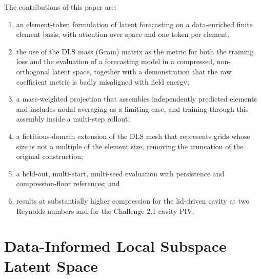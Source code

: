 \documentclass[conf]{new-aiaa}
\begin{document}
The contributions of this paper are:
\begin{enumerate}
  \item an element-token formulation of latent forecasting on a data-enriched finite element basis, with attention over space and one token per element;
  \item the use of the DLS mass (Gram) matrix as the metric for both the training loss and the evaluation of a forecasting model in a compressed, non-orthogonal latent space, together with a demonstration that the raw coefficient metric is badly misaligned with field energy;
  \item a mass-weighted projection that assembles independently predicted elements and includes nodal averaging as a limiting case, and training through this assembly inside a multi-step rollout;
  \item a fictitious-domain extension of the DLS mesh that represents grids whose size is not a multiple of the element size, removing the truncation of the original construction;
  \item a held-out, multi-start, multi-seed evaluation with persistence and compression-floor references; and
  \item results at substantially higher compression for the lid-driven cavity at two Reynolds numbers and for the Challenge 2.1 cavity PIV.
\end{enumerate}

\section{Data-Informed Local Subspace Latent Space}
\label{sec:dls}
\end{document}
